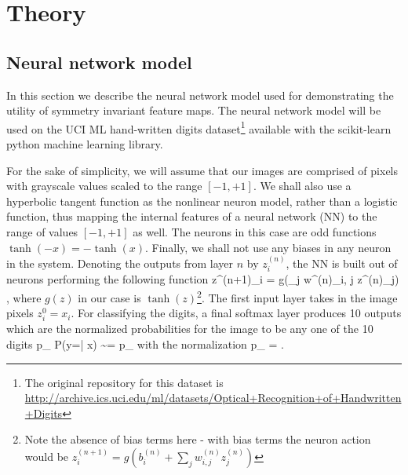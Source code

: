 \documentclass[twocolumn, prl, nofootinbib]{revtex4-1}
\begin{document}



\section{Theory}
\label{Sec:theory}
\subsection{Neural network model}
\label{Sec:dumb_NN}

In this section we describe the neural network model used for demonstrating the utility of symmetry invariant feature maps. The neural network model will be used on the UCI ML hand-written digits dataset\footnote{The original repository for this dataset is \url{http://archive.ics.uci.edu/ml/datasets/Optical+Recognition+of+Handwritten+Digits}} available with the scikit-learn python machine learning library\cite{Dua:2017}.

For the sake of simplicity, we will assume that our images are comprised of pixels with grayscale values scaled to the range $[-1,+1]$. We shall also use a hyperbolic tangent function as the nonlinear neuron model, rather than a logistic function, thus mapping the internal features of a neural network (NN) to the range of values $[-1, +1]$ as well. The neurons in this case are odd functions $\tanh(-x) = - \tanh(x)$. Finally, we shall not use any biases in any neuron in the system. Denoting the outputs from layer $n$ by $z^{(n)}_i$, the NN is built out of neurons performing the following function
\be
z^{(n+1)}_i = g\left(\sum_j w^{(n)}_{i, j} z^{(n)}_j\right)
\; ,
\ee
where $g(z)$ in our case is $\tanh(z)$\footnote{Note the absence of bias terms here - with bias terms the neuron action would be 
$ z^{(n+1)}_i = g\left(b^{(n)}_i + \sum_j w^{(n)}_{i, j} z^{(n)}_j\right) $}. The first input layer takes in the image pixels $z^0_i = x_i$. For classifying the digits, a final softmax layer produces 10 outputs which are the normalized probabilities for the image to be any one of the 10 digits
\be\label{softmax_1}
p_{\alpha} \equiv P(y=\alpha | x) \sim \exp{} = {\tilde p}_{\alpha}
\ee
with the normalization
\be\label{softmax_2}
p_{\alpha} = 
\; .
\ee
\end{document}
